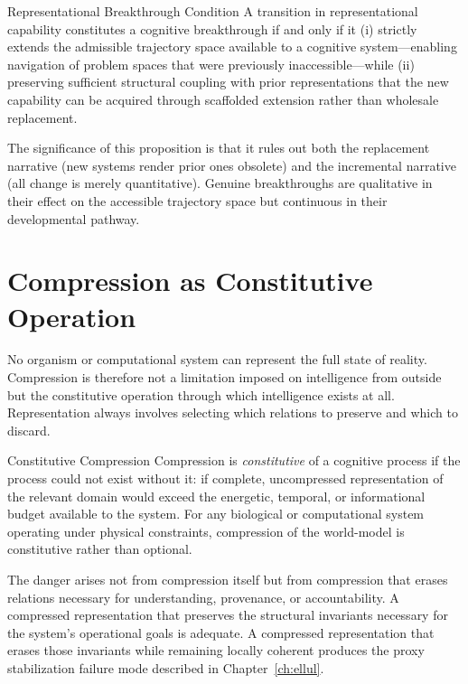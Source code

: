 \begin{proposition}{Representational Breakthrough Condition}
A transition in representational capability constitutes a cognitive breakthrough if
and only if it (i) strictly extends the admissible trajectory space available to
a cognitive system---enabling navigation of problem spaces that were previously
inaccessible---while (ii) preserving sufficient structural coupling with prior
representations that the new capability can be acquired through scaffolded extension
rather than wholesale replacement.
\end{proposition}

The significance of this proposition is that it rules out both the replacement narrative
(new systems render prior ones obsolete) and the incremental narrative (all change is
merely quantitative). Genuine breakthroughs are qualitative in their effect on the
accessible trajectory space but continuous in their developmental pathway.

\section{Compression as Constitutive Operation}

No organism or computational system can represent the full state of reality. Compression
is therefore not a limitation imposed on intelligence from outside but the constitutive
operation through which intelligence exists at all. Representation always involves
selecting which relations to preserve and which to discard.

\begin{definition}{Constitutive Compression}
Compression is \emph{constitutive} of a cognitive process if the process could not
exist without it: if complete, uncompressed representation of the relevant domain
would exceed the energetic, temporal, or informational budget available to the
system. For any biological or computational system operating under physical
constraints, compression of the world-model is constitutive rather than optional.
\end{definition}

The danger arises not from compression itself but from compression that erases
relations necessary for understanding, provenance, or accountability. A compressed
representation that preserves the structural invariants necessary for the system's
operational goals is adequate. A compressed representation that erases those invariants
while remaining locally coherent produces the proxy stabilization failure mode described
in Chapter~\ref{ch:ellul}.

